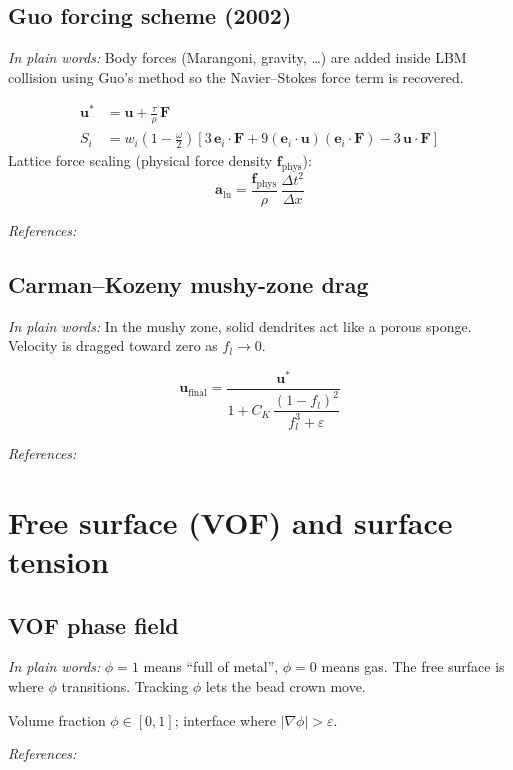 \documentclass[11pt,a4paper]{article}
\newcommand{\vect}[1]{\mathbf{#1}}
\newcommand{\fref}[1]{\par\smallskip\noindent\textit{References:} #1\par}
\newcommand{\newbie}[1]{\par\medskip\noindent\textit{In plain words:} #1\par\medskip}
\begin{document}
\subsection{Guo forcing scheme (2002)}
\newbie{Body forces (Marangoni, gravity, \ldots) are added inside LBM collision
using Guo's method so the Navier--Stokes force term is recovered.}

\begin{align}
  \vect{u}^\ast &= \vect{u} + \frac{\tau}{\rho}\,\vect{F} \\
  S_i &= w_i\left(1 - \frac{\omega}{2}\right)
  \left[3\,\vect{e}_i\cdot\vect{F}
  + 9(\vect{e}_i\cdot\vect{u})(\vect{e}_i\cdot\vect{F})
  - 3\,\vect{u}\cdot\vect{F}\right]
\end{align}
Lattice force scaling (physical force density $\vect{f}_{\mathrm{phys}}$):
\begin{equation}
  \vect{a}_{\mathrm{lu}}
  = \frac{\vect{f}_{\mathrm{phys}}}{\rho}\,\frac{\Delta t^2}{\Delta x}
\end{equation}
\fref{\cite{Guo2002,Kruger2017,waam_twin2025}}

\subsection{Carman--Kozeny mushy-zone drag}
\newbie{In the mushy zone, solid dendrites act like a porous sponge. Velocity is
dragged toward zero as $f_l\to 0$.}

\begin{equation}
  \vect{u}_{\mathrm{final}} = \frac{\vect{u}^\ast}
  {1 + C_K\,\dfrac{(1-f_l)^2}{f_l^3 + \varepsilon}}
\end{equation}
\fref{\cite{Voller1987,Poirier1987,waam_twin2025}}

\section{Free surface (VOF) and surface tension}

\subsection{VOF phase field}
\newbie{$\phi=1$ means ``full of metal'', $\phi=0$ means gas. The free surface
is where $\phi$ transitions. Tracking $\phi$ lets the bead crown move.}

Volume fraction $\phi \in [0,1]$; interface where $|\nabla\phi| > \varepsilon$.
\fref{\cite{Hirt1981,Rider2001}}
\end{document}
